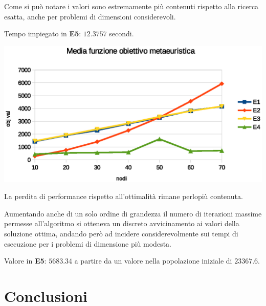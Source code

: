\documentclass[a4paper]{article}
\begin{document}
                    Come si pu\`o notare i valori sono estremamente pi\`u contenuti rispetto alla ricerca esatta, anche per problemi di dimensioni
                    considerevoli.

                    Tempo impiegato in \textbf{E5}: $12.3757$ secondi.

                    \includegraphics[scale=0.7]{img/gavgobj}

                    La perdita di performance rispetto all'ottimalit\`a rimane perlopi\`u contenuta.

                    Aumentando anche di un solo ordine di grandezza il numero di iterazioni massime permesse all'algoritmo si otteneva un discreto
                    avvicinamento ai valori della soluzione ottima, andando per\`o ad incidere considerevolmente sui tempi di esecuzione per i problemi
                    di dimensione pi\`u modesta.

                    Valore in \textbf{E5}: $5683.34$ a partire da un valore nella popolazione iniziale di $23367.6$.


    \section{Conclusioni}
\end{document}
